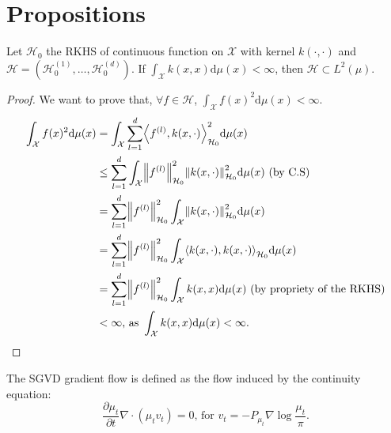 \documentclass[runningheads,a4paper]{llncs}
\newcommand{\X}{\mathcal{X}}
\newcommand{\Hr}{\mathcal{H}}
\newcommand{\diff}[2]{\frac{\partial #1}{\partial #2}}
\newcommand{\dr}{\mathrm{d}}
\DeclarePairedDelimiter{\norm}{\|}{\|}
\DeclarePairedDelimiter{\sca}{\langle}{\rangle}
\begin{document}
\section{Propositions}
\begin{proposition}
  Let $\Hr_0$ the RKHS of continuous function on $\X$ with kernel
  $k(\cdot, \cdot)$ and $\Hr = (\Hr_0^{(1)}, \dots, \Hr_0^{(d)})$.
  If $\int_\X k(x,x) \dr \mu(x) < \infty$, then $\Hr \subset L^2(\mu)$.

  \begin{proof}
    We want to prove that, $\forall f \in \Hr$, $\int_\X f(x)^2 \dr \mu(x) < \infty$.
    \begin{align*}
      \int_\X f(x)^2 \dr \mu(x) &= \int_\X \sum_{l=1}^d \sca*{ f^{(l)}, k(x, \cdot) }^2_{\Hr_0} \dr \mu(x) \\
      &\leq \sum_{l=1}^d \int_\X \norm*{f^{(l)}}^2_{\Hr_0} \norm*{k(x, \cdot)}^2_{\Hr_0} \dr \mu(x)
        \text{ (by C.S)} \\
      &= \sum_{l=1}^d \norm*{f^{(l)}}^2_{\Hr_0} \int_\X \norm*{k(x, \cdot)}^2_{\Hr_0} \dr \mu(x) \\
      &= \sum_{l=1}^d \norm*{f^{(l)}}^2_{\Hr_0} \int_\X \sca*{k(x, \cdot), k(x, \cdot)}_{\Hr_0} \dr \mu(x) \\
      &= \sum_{l=1}^d \norm*{f^{(l)}}^2_{\Hr_0} \int_\X k(x, x) \dr \mu(x)
        \text{ (by propriety of the RKHS)} \\
      &< \infty \text{, as } \int_\X k(x, x) \dr \mu(x) < \infty.
    \end{align*}
  \end{proof}
\end{proposition}

\begin{definition}
  The SGVD gradient flow is defined as the flow induced by the continuity equation:
  \begin{equation}
  \diff{\mu_t}{t} \nabla \cdot (\mu_t v_t) = 0 \text{, for } v_t = -P_{\mu_t} \nabla \log \frac{\mu_t}{\pi}.
  \label{eq:continuity}
  \end{equation}
\end{definition}
\end{document}
